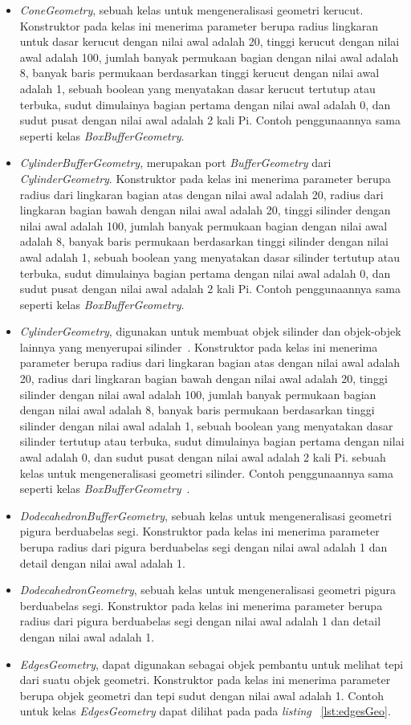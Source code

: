\begin{itemize}
\begin{itemize}
		\item {\it ConeGeometry}, sebuah kelas untuk mengeneralisasi geometri kerucut. Konstruktor pada kelas ini menerima parameter berupa radius lingkaran untuk dasar kerucut dengan nilai awal adalah 20, tinggi kerucut dengan nilai awal adalah 100, jumlah banyak permukaan bagian dengan nilai awal adalah 8, banyak baris permukaan berdasarkan tinggi kerucut dengan nilai awal adalah 1, sebuah boolean yang menyatakan dasar kerucut tertutup atau terbuka, sudut dimulainya bagian pertama dengan nilai awal adalah 0, dan sudut pusat dengan nilai awal adalah 2 kali Pi. Contoh penggunaannya sama seperti kelas {\it BoxBufferGeometry}.
		\item {\it CylinderBufferGeometry}, merupakan port {\it BufferGeometry} dari {\it CylinderGeometry}. Konstruktor pada kelas ini menerima parameter berupa radius dari lingkaran bagian atas dengan nilai awal adalah 20, radius dari lingkaran bagian bawah dengan nilai awal adalah 20, tinggi silinder dengan nilai awal adalah 100, jumlah banyak permukaan bagian dengan nilai awal adalah 8, banyak baris permukaan berdasarkan tinggi silinder dengan nilai awal adalah 1, sebuah boolean yang menyatakan dasar silinder tertutup atau terbuka, sudut dimulainya bagian pertama dengan nilai awal adalah 0, dan sudut pusat dengan nilai awal adalah 2 kali Pi. Contoh penggunaannya sama seperti kelas {\it BoxBufferGeometry}.
		\item {\it CylinderGeometry}, digunakan untuk membuat objek silinder dan objek-objek lainnya yang menyerupai silinder~\cite{learningThreejs}. Konstruktor pada kelas ini menerima parameter berupa radius dari lingkaran bagian atas dengan nilai awal adalah 20, radius dari lingkaran bagian bawah dengan nilai awal adalah 20, tinggi silinder dengan nilai awal adalah 100, jumlah banyak permukaan bagian dengan nilai awal adalah 8, banyak baris permukaan berdasarkan tinggi silinder dengan nilai awal adalah 1, sebuah boolean yang menyatakan dasar silinder tertutup atau terbuka, sudut dimulainya bagian pertama dengan nilai awal adalah 0, dan sudut pusat dengan nilai awal adalah 2 kali Pi. sebuah kelas untuk mengeneralisasi geometri silinder. Contoh penggunaannya sama seperti kelas {\it BoxBufferGeometry}~\cite{threejs}.
		\item {\it DodecahedronBufferGeometry}, sebuah kelas untuk mengeneralisasi geometri pigura berduabelas segi. Konstruktor pada kelas ini menerima parameter berupa radius dari pigura berduabelas segi dengan nilai awal adalah 1 dan detail dengan nilai awal adalah 1.
		\item {\it DodecahedronGeometry}, sebuah kelas untuk mengeneralisasi geometri pigura berduabelas segi. Konstruktor pada kelas ini menerima parameter berupa radius dari pigura berduabelas segi dengan nilai awal adalah 1 dan detail dengan nilai awal adalah 1.
		\item {\it EdgesGeometry}, dapat digunakan sebagai objek pembantu untuk melihat tepi dari suatu objek geometri. Konstruktor pada kelas ini menerima parameter berupa objek geometri dan tepi sudut dengan nilai awal adalah 1. Contoh untuk kelas {\it EdgesGeometry} dapat dilihat pada pada {\it listing} ~\ref{lst:edgesGeo}.
	

\end{itemize}
\end{itemize}
